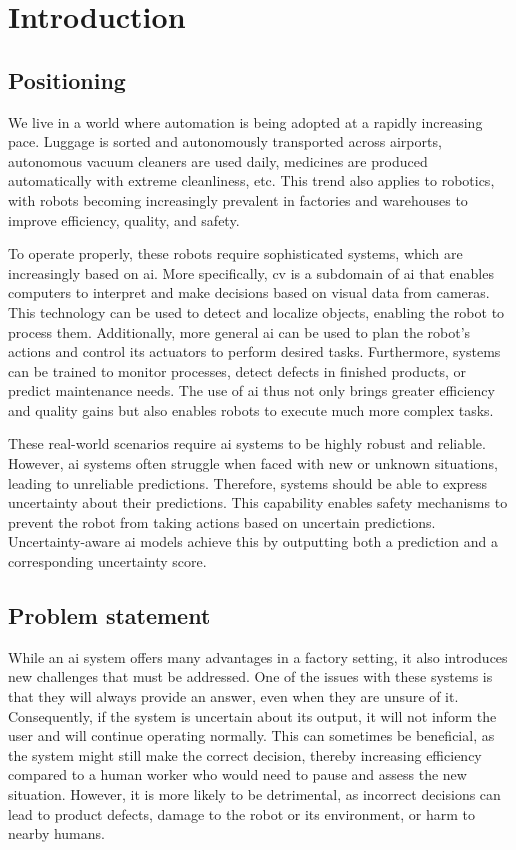 \chapter{Introduction}\label{ch:introduction}

\section{Positioning} \label{ch:introduction_section:positioning}
We live in a world where automation is being adopted at a rapidly increasing pace.
Luggage is sorted and autonomously transported across airports, autonomous vacuum cleaners are used daily, medicines are produced automatically with extreme cleanliness, etc.
This trend also applies to robotics, with robots becoming increasingly prevalent in factories and warehouses to improve efficiency, quality, and safety.

To operate properly, these robots require sophisticated systems, which are increasingly based on \gls{ai}.
More specifically, \gls{cv} is a subdomain of \gls{ai} that enables computers to interpret and make decisions based on visual data from cameras.
This technology can be used to detect and localize objects, enabling the robot to process them.
Additionally, more general \gls{ai} can be used to plan the robot's actions and control its actuators to perform desired tasks.
Furthermore, systems can be trained to monitor processes, detect defects in finished products, or predict maintenance needs.
The use of \gls{ai} thus not only brings greater efficiency and quality gains but also enables robots to execute much more complex tasks.

These real-world scenarios require \gls{ai} systems to be highly robust and reliable.
However, \gls{ai} systems often struggle when faced with new or unknown situations, leading to unreliable predictions.
Therefore, systems should be able to express uncertainty about their predictions.
This capability enables safety mechanisms to prevent the robot from taking actions based on uncertain predictions.
Uncertainty-aware \gls{ai} models achieve this by outputting both a prediction and a corresponding uncertainty score.

\section{Problem statement} \label{ch:introduction_section:problem-statement}
While an \gls{ai} system offers many advantages in a factory setting, it also introduces new challenges that must be addressed.
One of the issues with these systems is that they will always provide an answer, even when they are unsure of it.
Consequently, if the system is uncertain about its output, it will not inform the user and will continue operating normally.
This can sometimes be beneficial, as the system might still make the correct decision, thereby increasing efficiency compared to a human worker who would need to pause and assess the new situation.
However, it is more likely to be detrimental, as incorrect decisions can lead to product defects, damage to the robot or its environment, or harm to nearby humans.

